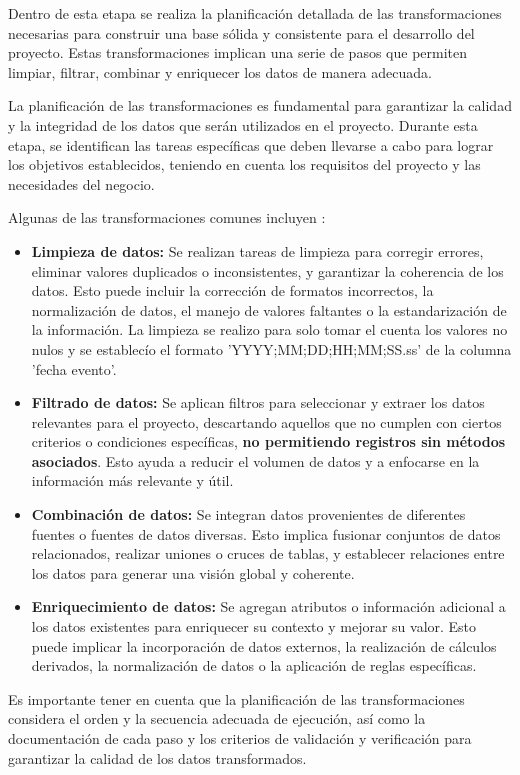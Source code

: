 Dentro de esta etapa se realiza la planificación detallada de las transformaciones necesarias para construir una base sólida y consistente para el desarrollo del proyecto. Estas transformaciones implican una serie de pasos que permiten limpiar, filtrar, combinar y enriquecer los datos de manera adecuada.

La planificación de las transformaciones es fundamental para garantizar la calidad y la integridad de los datos que serán utilizados en el proyecto. Durante esta etapa, se identifican las tareas específicas que deben llevarse a cabo para lograr los objetivos establecidos, teniendo en cuenta los requisitos del proyecto y las necesidades del negocio.

Algunas de las transformaciones comunes incluyen \cite{etl-toolkit}:

\begin{itemize}
    \item \textbf{Limpieza de datos:} Se realizan tareas de limpieza para corregir errores, eliminar valores duplicados o inconsistentes, y garantizar la coherencia de los datos. Esto puede incluir la corrección de formatos incorrectos, la normalización de datos, el manejo de valores faltantes o la estandarización de la información. La limpieza se realizo para solo tomar el cuenta los valores no nulos y se establecío el formato 'YYYY;MM;DD;HH;MM;SS.ss' de la columna 'fecha evento'.

    \item \textbf{Filtrado de datos:} Se aplican filtros para seleccionar y extraer los datos relevantes para el proyecto, descartando aquellos que no cumplen con ciertos criterios o condiciones específicas, \textbf{no permitiendo registros sin métodos asociados}. Esto ayuda a reducir el volumen de datos y a enfocarse en la información más relevante y útil.

    \item \textbf{Combinación de datos:} Se integran datos provenientes de diferentes fuentes o fuentes de datos diversas. Esto implica fusionar conjuntos de datos relacionados, realizar uniones o cruces de tablas, y establecer relaciones entre los datos para generar una visión global y coherente.

    \item \textbf{Enriquecimiento de datos:} Se agregan atributos o información adicional a los datos existentes para enriquecer su contexto y mejorar su valor. Esto puede implicar la incorporación de datos externos, la realización de cálculos derivados, la normalización de datos o la aplicación de reglas específicas.
\end{itemize}


Es importante tener en cuenta que la planificación de las transformaciones considera el orden y la secuencia adecuada de ejecución, así como la documentación de cada paso y los criterios de validación y verificación para garantizar la calidad de los datos transformados.
